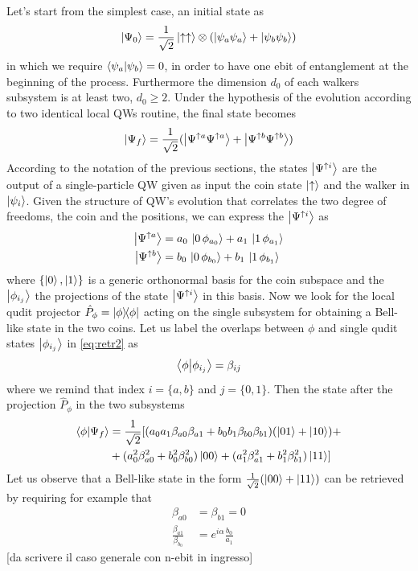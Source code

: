 \documentclass[
aps, pra, authorblock, superscriptaddress, twocolumn,
	10pt]{revtex4-1}
\begin{document}
Let's start from the simplest case, an initial state as
\begin{equation}
    \ket{\Psi_0}=\frac{1}{\sqrt{2}}\ket{\uparrow\uparrow}\otimes
    ( \ket{\psi_a\psi_a}+\ket{\psi_b\psi_b})
\end{equation}
in which we require $\braket{\psi_a}{\psi_b}=0$, in order to have one ebit of entanglement at the beginning of the process. Furthermore the dimension $d_0$ of each walkers subsystem is at least two, $d_0\geq 2$. Under the hypothesis of the evolution according to two identical local QWs routine, the final state becomes
\begin{equation}
    \ket{\Psi_f}=\frac{1}{\sqrt{2}}(\ket{\Psi^{\uparrow a}\Psi^{\uparrow a}}+\ket{\Psi^{\uparrow b}\Psi^{\uparrow b}})
    \label{eq:retr1}
\end{equation}
According to the notation of the previous sections, the states $\ket{\Psi^{\uparrow i}}$ are the output of a single-particle QW given as input the coin state $\ket{\uparrow}$ and the walker in $\ket{\psi_i}$. Given the structure of QW's evolution that correlates the two degree of freedoms, the coin and the positions, we can express the $\ket{\Psi^{\uparrow i}}$ as
\begin{align}
    \ket{\Psi^{\uparrow a}}&= a_0\,\ket{0\,\phi_{a_0}} +a_1\,\ket{1\,\phi_{a_1}} \notag\\
    \ket{\Psi^{\uparrow b}}&= b_0\,\ket{0\,\phi_{b_0}} +b_1\,\ket{1\,\phi_{b_1}}
    \label{eq:retr2}
\end{align}
where $\{\ket{0},\ket{1}\}$ is a generic orthonormal basis for the coin subspace and the $\ket{\phi_{i_j}}$ the projections of the state $\ket{\Psi^{\uparrow i}}$ in this basis. 
Now we look for the local qudit projector $\hat{P}_{\phi}=\ketbra{\phi}$ acting on the single subsystem for obtaining a Bell-like state in the two coins. Let us label the overlaps between $\phi$ and single qudit states $\ket{\phi_{i_j}}$ in \eqref{eq:retr2} as
\begin{equation}
    \braket{\phi}{\phi_{i_j}}=\beta_{ij}
\end{equation}
where we remind that index $i=\{a,b\}$ and $j=\{0,1\}$. Then the state after the projection $\hat{P}_{\phi}$ in the two subsystems
\begin{equation}
\begin{split}
    \braket{\phi}{\Psi_f}&=\frac{1}{\sqrt{2}}[(a_0a_1\beta_{a0}\beta_{a1}
    + b_0b_1 \beta_{b0}\beta_{b1})(\ket{01}+\ket{10})+\\
    &+(a_0^2\beta_{a0}^2+b_0^2\beta_{b0}^2)\ket{00}+ (a_1^2\beta_{a1}^2+b_1^2\beta_{b1}^2)\ket{11}]
\end{split}
\end{equation}
Let us observe that a Bell-like state in the form $\frac{1}{\sqrt{2}}(\ket{00}+\ket{11})$ can be retrieved by requiring for example that 
\begin{align}
\beta_{a0}&=\beta_{b1}=0 \label{eq:retr_cond1}\\
\frac{\beta_{a1}}{\beta_{b_0}}&= e^{i \alpha} \frac{b_0}{a_1} \label{eq:retr_cond2}
\end{align}
[da scrivere il caso generale con n-ebit in ingresso]
\end{document}
